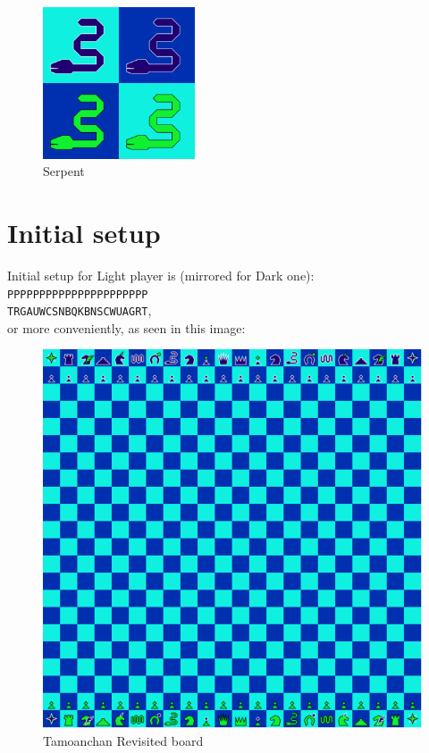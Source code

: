 \documentclass[a5paper,12pt,draft]{book} %
\begin{document}
\noindent
\begin{figure}
\includegraphics[width=0.4\textwidth, keepaspectratio=true]{../gfx/pieces/13_serpent.png}
\caption{Serpent}
\label{fig:serpent}
\end{figure}

\clearpage

\section*{Initial setup}

Initial setup for Light player is (mirrored for Dark one):
\texttt{PPPPPPPPPPPPPPPPPPPPPP \\
        TRGAUWCSNBQKBNSCWUAGRT}, \\
or more conveniently, as seen in this image:

\noindent
\begin{figure}[h]
\includegraphics[width=1.0\textwidth, keepaspectratio=true]{../gfx/boards/16_tamoanchan_revisited.png}
\caption{Tamoanchan Revisited board}
\label{fig:tamoanchan_revisited}
\end{figure}
\end{document}

